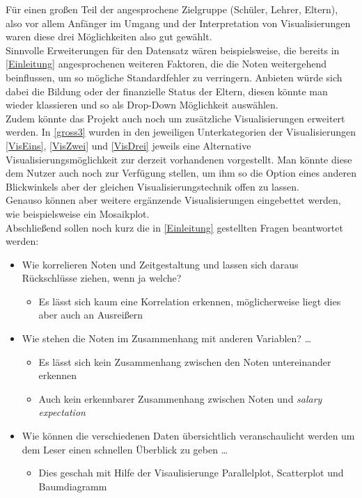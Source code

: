 \documentclass[usegeometry=true]{scrartcl}
\begin{document}
\noindent Für einen großen Teil der angesprochene Zielgruppe (Schüler, Lehrer, Eltern), also vor allem Anfänger im Umgang und der Interpretation von Visualisierungen waren diese drei Möglichkeiten also gut gewählt.\\

\noindent Sinnvolle Erweiterungen für den Datensatz wären beispielsweise, die bereits in \ref{Einleitung} angesprochenen weiteren Faktoren, die die Noten weitergehend beinflussen, um so mögliche Standardfehler zu verringern. Anbieten würde sich dabei die Bildung oder der finanzielle Status der Eltern, diesen könnte man wieder klassieren und so als Drop-Down Möglichkeit auswählen.\\ 

\noindent Zudem könnte das Projekt auch noch um zusätzliche Visualisierungen erweitert werden. In \ref{gross3} wurden in den jeweiligen Unterkategorien der Visualisierungen \ref{VisEins}, \ref{VisZwei} und \ref{VisDrei} jeweils eine Alternative Visualisierungsmöglichkeit zur derzeit vorhandenen vorgestellt. Man könnte diese dem Nutzer auch noch zur Verfügung stellen, um ihm so die Option eines anderen Blickwinkels aber der gleichen Visualisierungstechnik offen zu lassen.\\
Genauso können aber weitere ergänzende Visualisierungen eingebettet werden, wie beispielsweise ein Mosaikplot.\\

\noindent Abschließend sollen noch kurz die in \ref{Einleitung} gestellten Fragen beantwortet werden:

\begin{itemize} 
\item Wie korrelieren Noten und Zeitgestaltung und lassen sich daraus Rückschlüsse ziehen, wenn ja welche?
     \begin{itemize}[label=$\star$]
        \item Es lässt sich kaum eine Korrelation erkennen, möglicherweise liegt dies aber auch an 						Ausreißern
     \end{itemize}
\item Wie stehen die Noten im Zusammenhang mit anderen Variablen? \dots{}
	\begin{itemize}[label=$\star$]
        \item Es lässt sich kein Zusammenhang zwischen den Noten untereinander erkennen
        \item Auch kein erkennbarer Zusammenhang zwischen Noten und \textit{salary expectation}
     \end{itemize}
\item Wie können die verschiedenen Daten übersichtlich veranschaulicht werden um dem Leser einen schnellen Überblick zu geben \dots{}
	\begin{itemize}[label=$\star$]
        \item Dies geschah mit Hilfe der Visaulisierunge Parallelplot, Scatterplot und Baumdiagramm
     \end{itemize}
\end{itemize}
\end{document}
